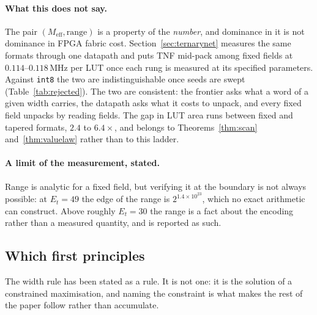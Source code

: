 \paragraph{What this does not say.} The pair $(M_{\mathrm{eff}}, \text{range})$ is
a property of the \emph{number}, and dominance in it is not dominance in FPGA fabric cost.
Section~\ref{sec:ternarynet} measures the same formats through one datapath and
puts TNF mid-pack among fixed fields at $0.114$--$0.118$\,MHz per LUT once
each rung is measured at its specified parameters. Against
\texttt{int8} the two are indistinguishable once seeds are swept
(Table~\ref{tab:rejected}). The two are consistent: the frontier asks what a word of
a given width carries, the datapath asks what it costs to unpack, and every fixed
field unpacks by reading fields. The gap in LUT area runs between fixed and tapered
formats, $2.4$ to $6.4\times$, and belongs to Theorems~\ref{thm:scan}
and~\ref{thm:valuelaw} rather than to this ladder.

\paragraph{A limit of the measurement, stated.} Range is analytic for a fixed
field, but verifying it at the boundary is not always possible: at $E_t = 49$ the
edge of the range is $2^{1.4 \times 10^{23}}$, which no exact arithmetic can
construct. Above roughly $E_t = 30$ the range is a fact about the encoding rather
than a measured quantity, and is reported as such.





\subsection{Which first principles}

\label{sec:principles}

The width rule has been stated as a rule. It is not one: it is the solution of a
constrained maximisation, and naming the constraint is what makes the rest of the
paper follow rather than accumulate.


